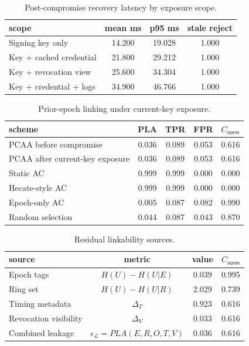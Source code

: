 \begin{table}[htbp]
\centering
\caption{Post-compromise recovery latency by exposure scope.}
\label{tab:recovery}
\begin{tabular}{@{}lccc@{}}
\toprule
scope & mean ms & p95 ms & stale reject \\
\midrule
Signing key only & 14.200 & 19.028 & 1.000 \\
Key + cached credential & 21.800 & 29.212 & 1.000 \\
Key + revocation view & 25.600 & 34.304 & 1.000 \\
Key + credential + logs & 34.900 & 46.766 & 1.000 \\
\bottomrule
\end{tabular}
\end{table}


\begin{table}[htbp]
\centering
\caption{Prior-epoch linking under current-key exposure.}
\label{tab:unlinkability-current-key}
\begin{tabular}{@{}lcccc@{}}
\toprule
scheme & PLA & TPR & FPR & $C_{\mathsf{norm}}$ \\
\midrule
PCAA before compromise & 0.036 & 0.089 & 0.053 & 0.616 \\
PCAA after current-key exposure & 0.036 & 0.089 & 0.053 & 0.616 \\
Static AC & 0.999 & 0.999 & 0.000 & 0.000 \\
Hecate-style AC & 0.999 & 0.999 & 0.000 & 0.000 \\
Epoch-only AC & 0.005 & 0.087 & 0.082 & 0.990 \\
Random selection & 0.044 & 0.087 & 0.043 & 0.870 \\
\bottomrule
\end{tabular}
\end{table}


\begin{table}[htbp]
\centering
\caption{Residual linkability sources.}
\label{tab:residual-sources}
\begin{tabular}{@{}lccc@{}}
\toprule
source & metric & value & $C_{\mathsf{norm}}$ \\
\midrule
Epoch tags & $H(U)-H(U|E)$ & 0.039 & 0.995 \\
Ring set & $H(U)-H(U|R)$ & 2.029 & 0.739 \\
Timing metadata & $\Delta_T$ & 0.923 & 0.616 \\
Revocation visibility & $\Delta_V$ & 0.033 & 0.616 \\
Combined leakage & $\epsilon_{\mathcal{L}}=PLA(E,R,O,T,V)$ & 0.036 & 0.616 \\
\bottomrule
\end{tabular}
\end{table}


